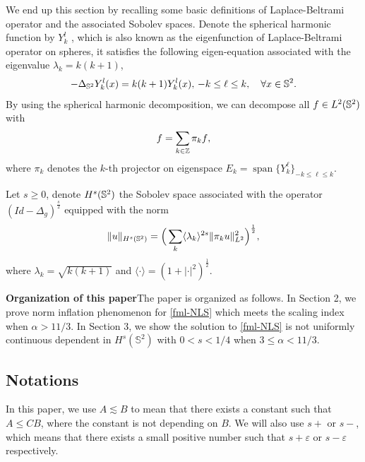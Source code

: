 \documentclass[10pt,a4paper]{amsart}
\numberwithin{equation}{section}
\begin{document}
	We end up this section by recalling some basic  definitions of Laplace-Beltrami operator and the associated Sobolev spaces.
	 Denote the spherical harmonic function by $Y_k^l$ , which is also known as the eigenfunction of Laplace-Beltrami operator on spheres, it  satisfies the following eigen-equation associated with the eigenvalue $\lambda_k=k(k+1)$,
\begin{align*}
	-\Delta_{\Bbb{S}^2}Y_{k}^l(x)=k(k+1)Y_{k}^l(x),\,-k\leq \ell\leq k,\quad\forall x\in\Bbb{S}^2.
\end{align*}
By using the spherical harmonic decomposition, we can decompose all $f\in L^2(\Bbb S^2)$ with
\begin{align*}
	f=\sum_{k\in\Bbb{Z}} {\pi_kf},
\end{align*}
where $\pi_k$ denotes the $k$-th projector on eigenspace $E_k=\operatorname{span}\{Y_{k}^\ell\}_{-k\leq\ell\leq k}$.

Let $s\geqslant0$, denote $H^s(\Bbb S^2)$ the Sobolev space associated with the operator $(Id-\Delta_g)^\frac{s}{2}$ equipped with the norm
\begin{align*}
	\Vert u\Vert_{H^s(\Bbb S^2)}=\Big(\sum_{k}\langle\lambda_k\rangle^{2s}\Vert \pi_ku\Vert_{L^2}^2\Big)^\frac{1}{2},
\end{align*}
where $\lambda_k=\sqrt{k(k+1)}$ and $\langle \cdot\rangle=(1+|\cdot|^2)^\frac12$.
	
\textbf{Organization of this paper}\hspace{2ex}The paper is organized as follows. In Section 2, we prove norm inflation phenomenon for \eqref{fml-NLS} which meets the scaling index when $\alpha>11/3$. In Section 3, we show the solution to \eqref{fml-NLS} is not uniformly continuous dependent in $H^s(\mathbb S^2)$ with $0<s<1/4$ when $3\leq\alpha<11/3$.
	
\subsection{Notations}
In this paper, we use $A\lesssim B$ to mean that there exists a constant such that $A\leqslant CB$, where the constant is not depending on $B$. We will also use $s+$ or $s-$, which means that there exists a small positive number such that $s+\varepsilon$ or $s-\varepsilon$ respectively.
	
	
	
	
\end{document}

